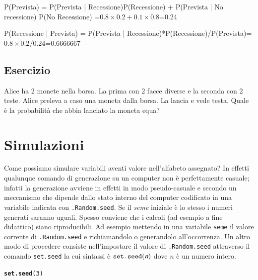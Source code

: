 \documentclass[onecolumn,12pt]{book}\usepackage[]{graphicx}\usepackage[]{color}
\makeatletter
\newcommand{\hlnum}[1]{\textcolor[rgb]{0.686,0.059,0.569}{#1}}%
\newcommand{\hlstd}[1]{\textcolor[rgb]{0.345,0.345,0.345}{#1}}%
\newcommand{\hlkwd}[1]{\textcolor[rgb]{0.737,0.353,0.396}{\textbf{#1}}}%
\newenvironment{kframe}{%
 \def\at@end@of@kframe{}%
 \ifinner\ifhmode%
  \def\at@end@of@kframe{\end{minipage}}%
  \begin{minipage}{\columnwidth}%
 \fi\fi%
 \def\FrameCommand##1{\hskip\@totalleftmargin \hskip-\fboxsep
 \colorbox{shadecolor}{##1}\hskip-\fboxsep
     \hskip-\linewidth \hskip-\@totalleftmargin \hskip\columnwidth}%
 \MakeFramed {\advance\hsize-\width
   \@totalleftmargin\z@ \linewidth\hsize
   \@setminipage}}%
 {\par\unskip\endMakeFramed%
 \at@end@of@kframe}
\newenvironment{knitrout}{}{} %
\newcommand{\varia}[1]{\textsl{\textsf{#1}}}
\makeatother
\begin{document}
P(Prevista) = P(Prevista | Recessione)P(Recessione) + P(Prevista | No recessione) P(No Recessione) =$0.8\times 0.2 + 0.1\times 0.8$=0.24



P(Recessione | Prevista) = P(Prevista | Recessione)*P(Recessione)/P(Prevista)=$0.8\times 0.2/0.24$=0.6666667



\subsection{Esercizio} 

Alice ha 2 monete nella borsa. La prima con 2 facce diverse e la seconda con 2 teste. Alice preleva a caso una moneta dalla borsa. La lancia e vede testa. Quale è la probabilità che abbia lanciato la moneta equa?


 
 
\section{Simulazioni}


Come possiamo simulare variabili aventi valore nell'alfabeto assegnato?
In effetti qualunque comando di generazione su un computer non \`e perfettamente casuale; infatti la generazione avviene in effetti in modo pseudo-casuale e  secondo un meccanismo che dipende dallo stato interno del computer codificato in una variabile indicata con \texttt{.Random.seed}. Se il {\it seme} iniziale \`e lo stesso i numeri generati saranno uguali. Spesso conviene che i calcoli (ad esempio a fine didattico) siano riproducibili. Ad esempio mettendo in una variabile \texttt{seme} il valore corrente di \texttt{.Random.seed} e richiamandolo o generandolo all'occorrenza.  
Un altro modo di procedere consiste nell'impostare il valore di 
\texttt{.Random.seed} attraverso il comando 
\texttt{set.seed}  la cui sintassi \`e 
$\texttt{set.seed}(\varia{n})$ dove $n$ \`e un numero intero.
 
\begin{knitrout}
\color{fgcolor}\begin{kframe}
\begin{alltt}
\hlkwd{set.seed}\hlstd{(}\hlnum{3}\hlstd{)}
\end{alltt}
\end{kframe}
\end{knitrout}
 
\end{document}
